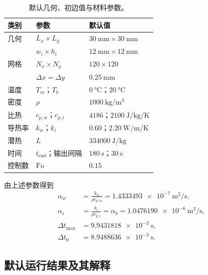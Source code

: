 \documentclass[UTF8,11pt]{ctexart}
\numberwithin{equation}{section}
\begin{document}
\begin{table}[htbp]
      \centering
      \caption{默认几何、初边值与材料参数。}
      \label{tab:default-parameters}
      \begin{tabular}{lll}
            \toprule
            类别 & 参数 & 默认值 \\
            \midrule
            几何 & $L_x\times L_y$ & $\SI{30}{\milli\metre}\times\SI{30}{\milli\metre}$ \\
                 & $w_i\times h_i$ & $\SI{12}{\milli\metre}\times\SI{12}{\milli\metre}$ \\
            网格 & $N_x\times N_y$ & $120\times120$ \\
                 & $\Delta x=\Delta y$ & $\SI{0.25}{\milli\metre}$ \\
            温度 & $T_m$；$T_b$ & $\SI{0}{\degreeCelsius}$；$\SI{20}{\degreeCelsius}$ \\
            密度 & $\rho$ & $\SI{1000}{\kilogram\per\metre\cubed}$ \\
            比热 & $c_{p,w}$；$c_{p,i}$ & $4186$；$2100\ \si{\joule\per\kilogram\per\kelvin}$ \\
            导热率 & $k_w$；$k_i$ & $0.60$；$2.20\ \si{\watt\per\metre\per\kelvin}$ \\
            潜热 & $L$ & $\SI{334000}{\joule\per\kilogram}$ \\
            时间 & $t_{\mathrm{end}}$；输出间隔 & $\SI{180}{\second}$；$\SI{30}{\second}$ \\
            控制数 & $\mathrm{Fo}$ & $0.15$ \\
            \bottomrule
      \end{tabular}
\end{table}

由上述参数得到
\begin{align}
      \alpha_w&=\frac{k_w}{\rho c_{p,w}}
      =\SI{1.4333493e-7}{\metre\squared\per\second},\\
      \alpha_i&=\frac{k_i}{\rho c_{p,i}}
      =\alpha_b
      =\SI{1.0476190e-6}{\metre\squared\per\second},\\
      \Delta t_{\max}&=\SI{9.9431818e-3}{\second},\\
      \Delta t_0&=\SI{8.9488636e-3}{\second}.
      \label{eq:default-derived}
\end{align}

\subsection{默认运行结果及其解释}
\end{document}
